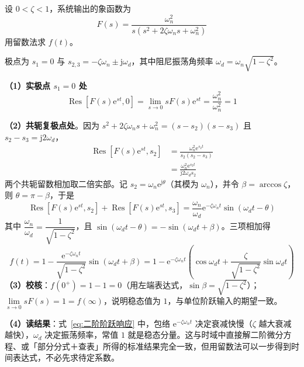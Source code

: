 \begin{longexample}
\label{exam:二阶阶跃}
设 $0<\zeta<1$，系统输出的象函数为
\[
F(s)=\frac{\omega_n^{2}}{s\left(s^{2}+2\zeta\omega_n s+\omega_n^{2}\right)}
\]
用留数法求 $f(t)$。
\begin{solution}
极点为 $s_1=0$ 与 $s_{2,3}=-\zeta\omega_n\pm\mathrm{j}\omega_d$，其中阻尼振荡角频率 $\omega_d=\omega_n\sqrt{1-\zeta^{2}}$。

\textbf{（1）实极点 $s_1=0$ 处}
\[
\operatorname{Res}\left[F(s)\mathrm{e}^{st},0\right]=\lim_{s\to0}sF(s)\mathrm{e}^{st}=\frac{\omega_n^{2}}{\omega_n^{2}}=1
\]

\textbf{（2）共轭复极点处}。因为 $s^{2}+2\zeta\omega_n s+\omega_n^{2}=(s-s_2)(s-s_3)$ 且 $s_2-s_3=\mathrm{j}2\omega_d$，
\[
\begin{aligned}
\operatorname{Res}\left[F(s)\mathrm{e}^{st},s_2\right]
&=\frac{\omega_n^{2}\mathrm{e}^{s_2t}}{s_2\left(s_2-s_3\right)}\\
&=\frac{\omega_n^{2}\mathrm{e}^{s_2t}}{\mathrm{j}2\omega_d s_2}
\end{aligned}
\]
两个共轭留数相加取二倍实部。记 $s_2=\omega_n\mathrm{e}^{\mathrm{j}\theta}$（其模为 $\omega_n$），并令 $\beta=\arccos\zeta$，则 $\theta=\pi-\beta$，于是
\[
\operatorname{Res}\left[F(s)\mathrm{e}^{st},s_2\right]+\operatorname{Res}\left[F(s)\mathrm{e}^{st},s_3\right]
=\frac{\omega_n}{\omega_d}\mathrm{e}^{-\zeta\omega_n t}\sin\left(\omega_d t-\theta\right)
\]
其中 $\dfrac{\omega_n}{\omega_d}=\dfrac{1}{\sqrt{1-\zeta^{2}}}$，且 $\sin(\omega_d t-\theta)=-\sin(\omega_d t+\beta)$。三项相加得
\begin{equation}
f(t)=1-\frac{\mathrm{e}^{-\zeta\omega_n t}}{\sqrt{1-\zeta^{2}}}\sin\left(\omega_d t+\beta\right)
=1-\mathrm{e}^{-\zeta\omega_n t}\left(\cos\omega_d t+\frac{\zeta}{\sqrt{1-\zeta^{2}}}\sin\omega_d t\right)
\label{eq:二阶阶跃响应}
\end{equation}
\textbf{（3）校核}：$f(0^{+})=1-1=0$（用左端表达式，$\sin\beta=\sqrt{1-\zeta^{2}}$）；$\lim\limits_{s\to0}sF(s)=1=f(\infty)$，说明稳态值为 $1$，与单位阶跃输入的期望一致。

\textbf{（4）读结果}：式~\eqref{eq:二阶阶跃响应} 中，包络 $\mathrm{e}^{-\zeta\omega_n t}$ 决定衰减快慢（$\zeta$ 越大衰减越快），$\omega_d$ 决定振荡频率，常值 $1$ 就是稳态分量。这与时域中直接解二阶微分方程、或「部分分式＋查表」所得的标准结果完全一致，但用留数法可以一步得到时间表达式，不必先求待定系数。
\end{solution}
\end{longexample}

